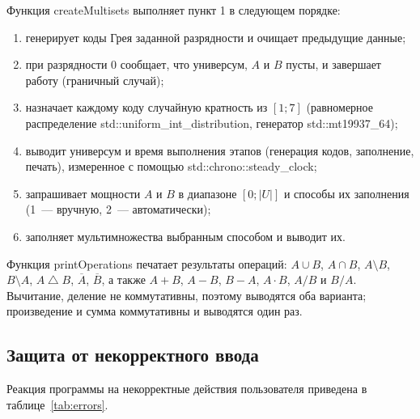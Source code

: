 \documentclass[14pt,a4paper]{extarticle}
\newcommand{\card}[1]{\left|#1\right|}
\newcommand{\code}[1]{{\monofont #1}}
\newcommand{\bigtri}{\mathbin{\triangle}}
\begin{document}
Функция \code{createMultisets} выполняет пункт 1 в следующем порядке:
\begin{enumerate}
\item генерирует коды Грея заданной разрядности и очищает предыдущие данные;
\item при разрядности 0 сообщает, что универсум, $A$ и $B$ пусты, и завершает работу (граничный случай);
\item назначает каждому коду случайную кратность из $[1;7]$ (равномерное распределение \code{std::uniform\_int\_distribution}, генератор \code{std::mt19937\_64});
\item выводит универсум и время выполнения этапов (генерация кодов, заполнение, печать), измеренное с помощью \code{std::chrono::steady\_clock};
\item запрашивает мощности $A$ и $B$ в диапазоне $[0;\card{U}]$ и способы их заполнения (1~--- вручную, 2~--- автоматически);
\item заполняет мультимножества выбранным способом и выводит их.
\end{enumerate}
Функция \code{printOperations} печатает результаты операций: $A\cup B$, $A\cap B$, $A\setminus B$, $B\setminus A$, $A\bigtri B$, $\overline{A}$, $\overline{B}$, а также $A+B$, $A-B$, $B-A$, $A\cdot B$, $A/B$ и $B/A$. Вычитание, деление не коммутативны, поэтому выводятся оба варианта; произведение и сумма коммутативны и выводятся один раз.

\subsection{Защита от некорректного ввода}

Реакция программы на некорректные действия пользователя приведена в таблице~\ref{tab:errors}.
\end{document}
